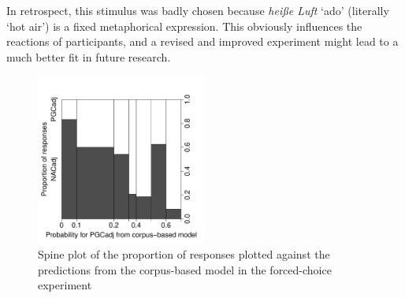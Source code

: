 \begin{exe}
\end{exe}

In retrospect, this stimulus was badly chosen because \textit{heiße Luft} `ado' (literally `hot air') is a fixed metaphorical expression.
This obviously influences the reactions of participants, and a revised and improved experiment might lead to a much better fit in future research.

\begin{figure}[htbp!]
  \centering
  \includegraphics[width=0.5\textwidth]{../R/output/fc_proportions}
  \caption{Spine plot of the proportion of responses plotted against the predictions from the corpus-based model in the forced-choice experiment}
  \label{fig:spines}
\end{figure}

